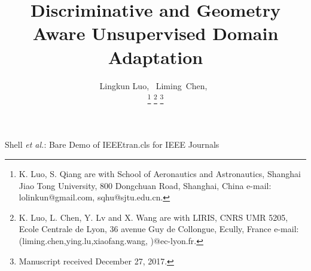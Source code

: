 \documentclass[journal,twocolumn]{IEEEtran}
\begin{document}
\begin{CJK*}{UTF8}{gkai}
\title{ Discriminative and  Geometry Aware Unsupervised Domain Adaptation}

\author{Lingkun Luo, ~Liming~Chen,~
         
\thanks{K. Luo, S. Qiang are with School of Aeronautics and Astronautics, Shanghai Jiao Tong University, 800 Dongchuan Road, Shanghai, China e-mail: lolinkun@gmail.com, sqhu@sjtu.edu.cn.}%
\thanks{K. Luo, L. Chen, Y. Lv and  X. Wang are with LIRIS, CNRS UMR 5205, 	Ecole Centrale de Lyon, 36 avenue Guy de Collongue, Ecully,  France e-mail: (liming.chen,ying.lu,xiaofang.wang, )@ec-lyon.fr.}
\thanks{Manuscript received December 27, 2017.}}




%
{Shell \MakeLowercase{\textit{et al.}}: Bare Demo of IEEEtran.cls for IEEE Journals}





\maketitle


\end{CJK*}
\end{document}

